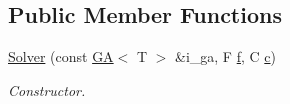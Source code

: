 \subsection*{Public Member Functions}
\begin{DoxyCompactItemize}
\item 
\hyperlink{classea_1_1_solver_3_01_g_a_00_01_t_00_01_f_00_01_c_01_4_a5c9e7819aa3d3a3ee99f67bc4a3aae5a}{Solver} (const \hyperlink{structea_1_1_g_a}{GA}$<$ T $>$ \&i\+\_\+ga, F \hyperlink{classea_1_1_solver__base_ae0a893780c93dfe17c1d17301de6494f}{f}, C \hyperlink{classea_1_1_solver__base_a6914e89d30e7484f2b4af1783f0de8c3}{c})
\begin{DoxyCompactList}\small\item\em Constructor. \end{DoxyCompactList}\end{DoxyCompactItemize}
